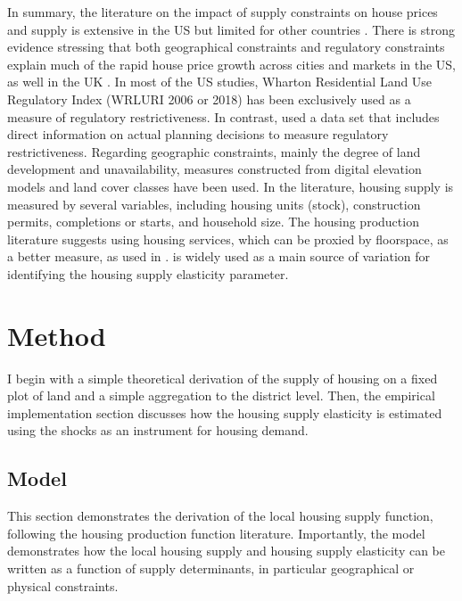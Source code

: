 \documentclass[
  12pt,
]{article}
\begin{document}
In summary, the literature on the impact of supply constraints on house prices and supply is extensive in the US but limited for other countries \citep{hilber-vermeulen2016}. There is strong evidence stressing that both geographical constraints \citep[see][]{saiz2010, paciorek2013} and regulatory constraints \citep[see][]{glaeser-gyourko2005, paciorek2013, gyourko-etal2021, glaeser2020} explain much of the rapid house price growth across cities and markets in the US, as well in the UK \citep{hilber-vermeulen2016}. In most of the US studies, Wharton Residential Land Use Regulatory Index (WRLURI 2006 or 2018) has been exclusively used as a measure of regulatory restrictiveness. In contrast, \citet{hilber-vermeulen2016} used a data set that includes direct information on actual planning decisions to measure regulatory restrictiveness. Regarding geographic constraints, mainly the degree of land development and unavailability, measures constructed from digital elevation models and land cover classes have been used. In the literature, housing supply is measured by several variables, including housing units (stock), construction permits, completions or starts, and household size. The housing production literature \citep[see][]{epple-etal2010, combes-etal2021} suggests using housing services, which can be proxied by floorspace, as a better measure, as used in \citet{baumsnow-han2019}. \citet{bartik1991} is widely used as a main source of variation for identifying the housing supply elasticity parameter.

\section{Method}\label{method}

I begin with a simple theoretical derivation of the supply of housing on a fixed plot of land and a simple aggregation to the district level. Then, the empirical implementation section discusses how the housing supply elasticity is estimated using the \citet{bartik1991} shocks as an instrument for housing demand.

\subsection{Model}\label{model}

This section demonstrates the derivation of the local housing supply function, following the housing production function literature. Importantly, the model demonstrates how the local housing supply and housing supply elasticity can be written as a function of supply determinants, in particular geographical or physical constraints.
\end{document}

